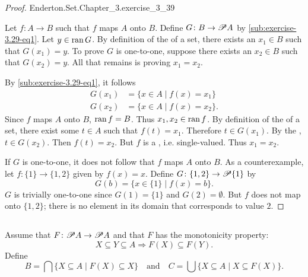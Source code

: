 \documentclass{report}
\begin{document}
\begin{proof}

    {Enderton.Set.Chapter\_3.exercise\_3\_39}

  Let $f \colon A \rightarrow B$ such that $f$ maps $A$ onto $B$.
  Define $G \colon B \rightarrow \mathscr{P}A$ by
    \eqref{sub:exercise-3.29-eq1}.
  Let $y \in \mathop{\text{ran}}{G}$.
  By definition of the  of a set, there exists an
    $x_1 \in B$ such that $G(x_1) = y$.
  To prove $G$ is one-to-one, suppose there exists an $x_2 \in B$ such
    that $G(x_2) = y$.
  All that remains is proving $x_1 = x_2$.

  By \eqref{sub:exercise-3.29-eq1}, it follows
    \begin{align*}
      G(x_1) & = \{x \in A \mid f(x) = x_1\} \\
      G(x_2) & = \{x \in A \mid f(x) = x_2\}.
    \end{align*}
  Since $f$ maps $A$ onto $B$, $\mathop{\text{ran}}{f} = B$.
  Thus $x_1, x_2 \in \mathop{\text{ran}}{f}$.
  By definition of the  of a set, there exist some $t \in A$
    such that $f(t) = x_1$.
  Therefore $t \in G(x_1)$.
  By the , $t \in G(x_2)$.
  Then $f(t) = x_2$.
  But $f$ is a , i.e. single-valued.
  Thus $x_1 = x_2$.

  \suitdivider
  If $G$ is one-to-one, it does not follow that $f$ maps $A$ onto $B$.
  As a counterexample, let $f \colon \{1\} \rightarrow \{1, 2\}$ given by
    $f(x) = x$.
  Define $G \colon \{1, 2\} \rightarrow \mathscr{P}\{1\}$ by
    $$G(b) = \{x \in \{1\} \mid f(x) = b\}.$$
  $G$ is trivially one-to-one since $G(1) = \{1\}$ and $G(2) = \emptyset$.
  But $f$ does not map onto $\{1, 2\}$; there is no element in its domain that
    corresponds to value $2$.

\end{proof}

\subsection{}%

Assume that $F \colon \mathscr{P}A \rightarrow \mathscr{P}A$ and that $F$ has
  the monotonicity property:
  $$X \subseteq Y \subseteq A \Rightarrow F(X) \subseteq F(Y).$$
Define
  $$B = \bigcap\{X \subseteq A \mid F(X) \subseteq X\} \quad\text{and}\quad
    C = \bigcup\{X \subseteq A \mid X \subseteq F(X)\}.$$
\end{document}
